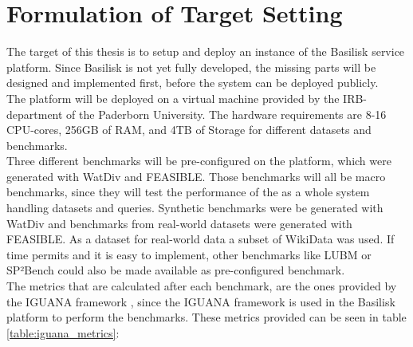 \chapter{Formulation of Target Setting}
\label{ch:target_setting}

The target of this thesis is to setup and deploy an instance of the Basilisk service platform.
Since Basilisk is not yet fully developed, the missing parts will be designed and implemented first, before the system can be deployed publicly. \\

The platform will be deployed on a virtual machine provided by the IRB-department of the Paderborn University.
The hardware requirements are 8-16 CPU-cores, 256GB of RAM, and 4TB of Storage for different datasets and benchmarks. \\

Three different benchmarks will be pre-configured on the platform, which were generated with WatDiv\cite{alucDiversifiedStressTesting2014} and FEASIBLE\cite{saleemFEASIBLEFeatureBasedSPARQL2015}.
Those benchmarks will all be macro benchmarks, since they will test the performance of the \tsp{} as a whole system handling datasets and queries.
Synthetic benchmarks were be generated with WatDiv and benchmarks from real-world datasets were generated with FEASIBLE.
As a dataset for real-world data a subset of WikiData was used.
If time permits and it is easy to implement, other benchmarks like LUBM\cite{guoLUBMBenchmarkOWL2005} or SP²Bench\cite{schmidtSP2BenchSPARQLPerformance2008} could also be made available as pre-configured benchmark.\\


The metrics that are calculated after each benchmark, are the ones provided by the IGUANA framework \cite{MetricsIguanaDocumentation}\cite{conradsIguanaGenericFramework2017}, since the IGUANA framework is used in the Basilisk platform to perform the benchmarks.
These metrics provided can be seen in table \ref{table:iguana_metrics}:

